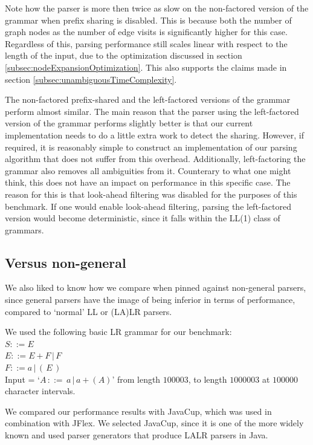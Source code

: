 \documentclass[a4paper,10pt]{article}
\begin{document}
Note how the parser is more then twice as slow on the non-factored version of the grammar when prefix sharing is disabled. This is because both the number of graph nodes as the number of edge visits is significantly higher for this case. Regardless of this, parsing performance still scales linear with respect to the length of the input, due to the optimization discussed in section \ref{subsec:nodeExpansionOptimization}. This also supports the claims made in section \ref{subsec:unambiguousTimeComplexity}.

The non-factored prefix-shared and the left-factored versions of the grammar perform almost similar. The main reason that the parser using the left-factored version of the grammar performs slightly better is that our current implementation needs to do a little extra work to detect the sharing. However, if required, it is reasonably simple to construct an implementation of our parsing algorithm that does not suffer from this overhead. Additionally, left-factoring the grammar also removes all ambiguities from it. Counterary to what one might think, this does not have an impact on performance in this specific case. The reason for this is that look-ahead filtering was disabled for the purposes of this benchmark. If one would enable look-ahead filtering, parsing the left-factored version would become deterministic, since it falls within the LL(1) class of grammars.

\subsection{Versus non-general}

We also liked to know how we compare when pinned against non-general parsers, since general parsers have the image of being inferior in terms of performance, compared to `normal' LL or (LA)LR parsers.

We used the following basic LR grammar for our benchmark:\\
$S ::= E$\\
$E ::= E + F\,|\,F$\\
$F ::= a\,|\,(\,E\,)$\\
Input = `$A\,::=\,a\,|\,a+(A)$' from length $100003$, to length $1000003$ at $100000$ character intervals.

We compared our performance results with JavaCup, which was used in combination with JFlex. We selected JavaCup, since it is one of the more widely known and used parser generators that produce LALR parsers in Java.
\end{document}
